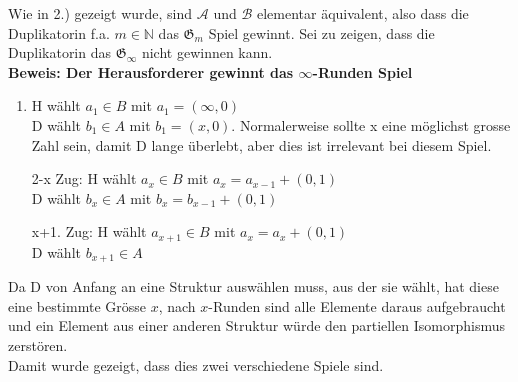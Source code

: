 \documentclass[a4paper,10pt]{article}
\newcommand{\N}{\mathbb{N}}
\begin{document}
Wie in 2.) gezeigt wurde, sind $\mathcal{A}$ und $\mathcal{B}$ elementar äquivalent, also dass die Duplikatorin f.a. $m \in \N$ das $\mathfrak{G}_m$ Spiel gewinnt.
Sei zu zeigen, dass die Duplikatorin das $\mathfrak{G}_{\infty}$ nicht gewinnen kann. \\

\textbf{Beweis: Der Herausforderer gewinnt das $\infty$-Runden Spiel}
		\begin{enumerate}[1. \text{Zug:}]
			\item  	H wählt $a_1 \in B$ mit $a_1 = (\infty, 0)$ \\
				D wählt $b_1 \in A$ mit $b_1 = (x,0)$. Normalerweise sollte x eine möglichst grosse Zahl sein, damit D lange überlebt, aber dies ist irrelevant bei diesem Spiel.
			\item[2-x Zug:] 	H wählt $a_x \in B$ mit $a_x = a_{x-1} + (0,1)$ \\
				D wählt $b_x \in A$ mit $b_x = b_{x-1} + (0,1)$

			\item[x+1. Zug:] 	H wählt $a_{x+1} \in B$ mit $a_x = a_{x} + (0,1)$ \\
						D wählt $b_{x+1} \in A$	
		\end{enumerate}
		Da D von Anfang an eine Struktur auswählen muss, aus der sie wählt, hat diese eine bestimmte Grösse $x$, nach $x$-Runden sind alle Elemente daraus aufgebraucht und ein Element aus einer anderen Struktur würde den partiellen Isomorphismus zerstören. \\

		Damit wurde gezeigt, dass dies zwei verschiedene Spiele sind.
\end{document}
